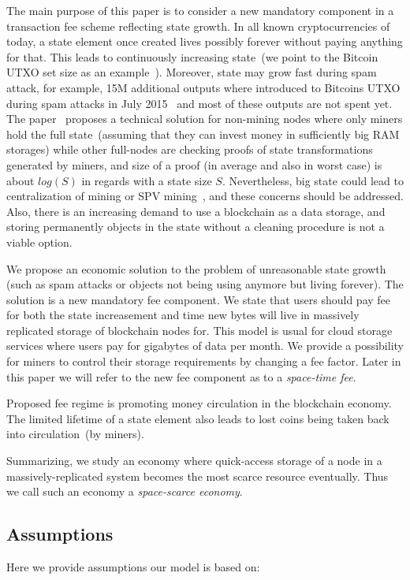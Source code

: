 \documentclass[]{llncs}   %
\begin{document}
The main purpose of this paper is to consider a new mandatory component in a transaction fee scheme reflecting state growth. In all known cryptocurrencies of today, a state element once created lives possibly forever without paying anything for that. This leads to continuously increasing state~(we point to the Bitcoin UTXO set size as an example~\cite{utxoChart}). Moreover, state may grow fast during spam attack, for example, 15M additional outputs where introduced to Bitcoins UTXO during spam attacks in July 2015~\cite{bitcoin2015flood} and most of these outputs are not spent yet. The paper~\cite{reyzin2016improving} proposes a technical solution for non-mining nodes where only miners hold the full state~(assuming that they can invest money in sufficiently big RAM storages) while other full-nodes are checking proofs of state transformations generated by miners, and size of a proof (in average and also in worst case) is about $log(S)$ in regards with a state size $S$. Nevertheless, big state could lead to centralization of mining or SPV mining~\cite{spvMining}, and these concerns should be addressed. Also, there is an increasing demand to use a blockchain as a data storage, and storing permanently objects in the state without a cleaning procedure is not a viable option.

We propose an economic solution to the problem of unreasonable state growth (such as spam attacks or objects not being using anymore but living forever). The solution is a new mandatory fee component. We state that users should pay fee for both the state increasement and time new bytes will live in massively replicated storage of blockchain nodes for. This model is usual for cloud storage services where users pay for gigabytes of data per month. We provide a possibility for miners to control their storage requirements by changing a fee factor. Later in this paper we will refer to the new fee component as to a \textit{space-time fee}.

Proposed fee regime is promoting money circulation in the blockchain economy. The limited lifetime of a state element also leads to lost coins being taken back into circulation~(by miners). 

Summarizing, we study an economy where quick-access storage of a node in a massively-replicated system becomes the most scarce resource eventually. Thus we call such an economy a \textit{space-scarce economy}.

\subsection{Assumptions}
Here we provide assumptions our model is based on:
\end{document}
